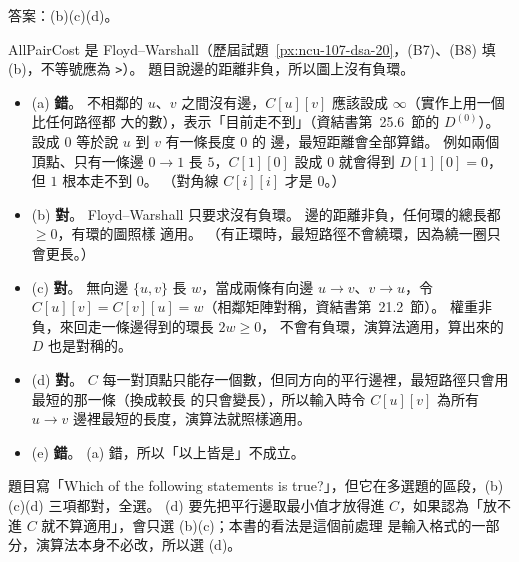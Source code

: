 \begin{pastsoln}
答案：(b)(c)(d)。

AllPairCost 是 Floyd--Warshall（歷屆試題~\ref{px:ncu-107-dsa-20}，(B7)、(B8) 填 (b)，不等號應為 \texttt{>}）。
題目說邊的距離非負，所以圖上沒有負環。

\begin{itemize}
\item (a) \textbf{錯}。 不相鄰的 $u$、$v$ 之間沒有邊，$C[u][v]$ 應該設成 $\infty$（實作上用一個比任何路徑都
大的數），表示「目前走不到」（資結書第~25.6~節的 $D^{(0)}$）。 設成 $0$ 等於說 $u$ 到 $v$ 有一條長度 $0$ 的
邊，最短距離會全部算錯。 例如兩個頂點、只有一條邊 $0 \to 1$ 長 $5$，$C[1][0]$ 設成 $0$ 就會得到
$D[1][0] = 0$，但 $1$ 根本走不到 $0$。 （對角線 $C[i][i]$ 才是 $0$。）
\item (b) \textbf{對}。 Floyd--Warshall 只要求沒有負環。 邊的距離非負，任何環的總長都 $\ge 0$，有環的圖照樣
適用。 （有正環時，最短路徑不會繞環，因為繞一圈只會更長。）
\item (c) \textbf{對}。 無向邊 $\{u, v\}$ 長 $w$，當成兩條有向邊 $u \to v$、$v \to u$，令
$C[u][v] = C[v][u] = w$（相鄰矩陣對稱，資結書第~21.2~節）。 權重非負，來回走一條邊得到的環長 $2w \ge 0$，
不會有負環，演算法適用，算出來的 $D$ 也是對稱的。
\item (d) \textbf{對}。 $C$ 每一對頂點只能存一個數，但同方向的平行邊裡，最短路徑只會用最短的那一條（換成較長
的只會變長），所以輸入時令 $C[u][v]$ 為所有 $u \to v$ 邊裡最短的長度，演算法就照樣適用。
\item (e) \textbf{錯}。 (a) 錯，所以「以上皆是」不成立。
\end{itemize}
題目寫「Which of the following statements is true?」，但它在多選題的區段，(b)(c)(d) 三項都對，全選。
(d) 要先把平行邊取最小值才放得進 $C$，如果認為「放不進 $C$ 就不算適用」，會只選 (b)(c)；本書的看法是這個前處理
是輸入格式的一部分，演算法本身不必改，所以選 (d)。
\end{pastsoln}
